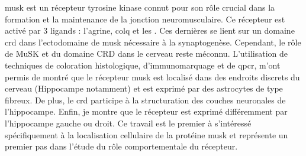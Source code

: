\Acrshort{musk} est un récepteur tyrosine kinase connut pour son rôle crucial dans la formation et la maintenance de la jonction neuromusculaire. Ce récepteur est activé par 3 ligands : l’agrine, \acrshort{colq}  et les . Ces dernières se lient sur un domaine \acrshort{crd} dans l’ectodomaine de \acrshort{musk} nécessaire à la synaptogenèse. Cependant, le rôle de MuSK et du domaine CRD dans le cerveau reste méconnu. L'utilisation de techniques de coloration histologique, d'immunomarquage et de \acrshort{qpcr}, m'ont permis de montré que le récepteur \acrshort{musk} est localisé dans des endroits discrets du cerveau (Hippocampe notamment) et est exprimé par des astrocytes de type fibreux. De plus, le \acrshort{crd} participe à la structuration des couches neuronales de l'hippocampe. Enfin, je montre que le récepteur est exprimé différemment par l'hippocampe gauche ou droit. Ce travail est le premier à s'intéressé spécifiquement à la localisation cellulaire de la protéine \acrshort{musk} et représente un premier pas dans l'étude du rôle comportementale du récepteur.